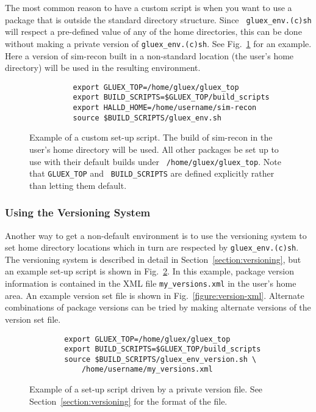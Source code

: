\documentclass[12pt]{article}
\begin{document}
The most common reason to have a custom script is when you want to use
a package that is outside the standard directory structure. Since {\tt
  gluex\_env.(c)sh} will respect a pre-defined value of any of the
home directories, this can be done without making a private version of
{\tt gluex\_env.(c)sh}. See Fig.~\ref{figure:custom-script} for an
example. Here a version of sim-recon built in a non-standard location
(the user's home directory) will be used in the resulting environment.

\begin{figure}
\begin{verbatim}
          export GLUEX_TOP=/home/gluex/gluex_top
          export BUILD_SCRIPTS=$GLUEX_TOP/build_scripts
          export HALLD_HOME=/home/username/sim-recon
          source $BUILD_SCRIPTS/gluex_env.sh
\end{verbatim}
\caption{Example of a custom set-up script. The build of sim-recon in
  the user's home directory will be used. All other packages be set up
  to use with their default builds under {\tt
    /home/gluex/gluex\_top}. Note that {\tt GLUEX\_TOP} and {\tt
  BUILD\_SCRIPTS} are defined explicitly rather than letting them
default.}\label{figure:custom-script}
\end{figure}

\subsubsection{Using the Versioning System}\label{section:env-use-versioning}

Another way to get a non-default environment is to use the versioning
system to set home directory locations which in turn are respected by
{\tt gluex\_env.(c)sh}. The versioning system is described in detail
in Section~\ref{section:versioning}, but an example set-up script is
shown in Fig.~\ref{figure:version-script}. In this example, package version
information is contained in the XML file {\tt my\_versions.xml} in the
user's home area. An example version set file is shown in Fig.~\ref{figure:version-xml}. Alternate combinations of package versions can be tried by making alternate versions of the version set file.

\begin{figure}
\begin{verbatim}
        export GLUEX_TOP=/home/gluex/gluex_top
        export BUILD_SCRIPTS=$GLUEX_TOP/build_scripts
        source $BUILD_SCRIPTS/gluex_env_version.sh \
            /home/username/my_versions.xml
\end{verbatim}
\caption{Example of a set-up script driven by a private version
  file. See Section~\ref{section:versioning} for the format of the
  file.}\label{figure:version-script}
\end{figure}
\end{document}
